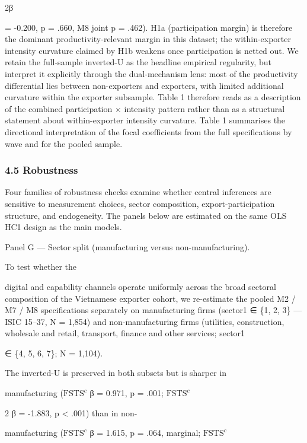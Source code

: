 \documentclass[12pt,a4paper]{article}
\begin{document}
2β

= -0.200, p = .660, M8 joint p = .462). H1a (participation margin) is
therefore the dominant productivity-relevant margin in this dataset; the
within-exporter intensity curvature claimed by H1b weakens once
participation is netted out. We retain the full-sample inverted-U as the
headline empirical regularity, but interpret it explicitly through the
dual-mechanism lens: most of the productivity differential lies between
non-exporters and exporters, with limited additional curvature within
the exporter subsample. Table 1 therefore reads as a description of the
combined participation × intensity pattern rather than as a structural
statement about within-exporter intensity curvature. Table 1 summarises
the directional interpretation of the focal coefficients from the full
specifications by wave and for the pooled sample.

\hypertarget{45-robustness}{%
\subsubsection{4.5 Robustness}\label{45-robustness}}

Four families of robustness checks examine whether central inferences
are sensitive to measurement choices, sector composition,
export-participation structure, and endogeneity. The panels below are
estimated on the same OLS HC1 design as the main models.

Panel G --- Sector split (manufacturing versus non-manufacturing).

To test whether the

digital and capability channels operate uniformly across the broad
sectoral composition of the Vietnamese exporter cohort, we re-estimate
the pooled M2 / M7 / M8 specifications separately on manufacturing firms
(sector1 ∈ \{1, 2, 3\} --- ISIC 15--37, N = 1,854) and non-manufacturing
firms (utilities, construction, wholesale and retail, transport, finance
and other services; sector1

∈ \{4, 5, 6, 7\}; N = 1,104).

The inverted-U is preserved in both subsets but is sharper in

manufacturing (\(\mathrm{FSTS}^{c}\) β = 0.971, p = .001;
\(\mathrm{FSTS}^{c}\)

2 β = -1.883, p \textless{} .001) than in non-

manufacturing (\(\mathrm{FSTS}^{c}\) β = 1.615, p = .064, marginal;
\(\mathrm{FSTS}^{c}\)
\end{document}
